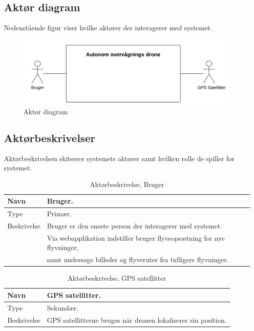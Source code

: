 \subsection{Aktør diagram}
Nedenstående figur viser hvilke aktører der interagerer med systemet.

\begin{figure}[H]
\centering
\includegraphics[width=1\textwidth]{Billeder/Aktor_diagram.png}
\caption{Aktør diagram}
\label{fig:ATD}
\end{figure}

\subsection{Aktørbeskrivelser}
Aktørbeskrivelsen skitserer systemets aktører samt hvilken rolle de spiller for systemet.


\begin{table}[H]
\begin{tabular}{|l|p{13.25cm}|} \hline

Navn					& Bruger. 	\\\hline
Type					& Primær.	\\\hline
Beskrivelse				& Bruger er den eneste person der interagerer med systemet.\\
						& Via webapplikation indstiller bruger flyveopsætning for nye flyvninger, \\ 
						& samt undersøge billeder og flyveruter fra tidligere flyvninger.\\\hline
						
\end{tabular}
\caption{Aktørbeskrivelse, Bruger}
\label{tab:AB1}
\end{table}


\begin{table}[H]
\begin{tabular}{|l|p{13.25cm}|}
\hline
Navn					& GPS satellitter. 	\\\hline
Type					& Sekundær.	\\\hline
Beskrivelse				& GPS satellitterne bruges når dronen lokaliserer sin position.\\\hline

\end{tabular}
\caption{Aktørbeskrivelse, GPS satellitter}
\label{tab:AB1}
\end{table}